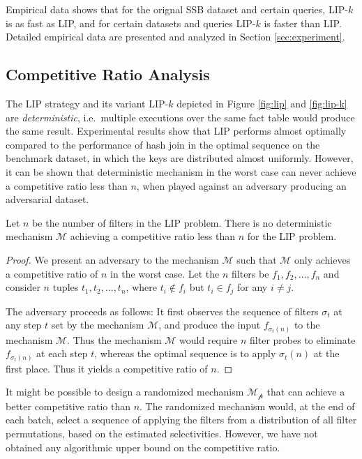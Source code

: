 Empirical data shows that for the orignal SSB dataset and certain queries, LIP-$k$ is as fast as LIP, and for certain datasets and queries LIP-$k$ is faster than LIP. Detailed empirical data are presented and analyzed in Section \ref{sec:experiment}.



\subsection{Competitive Ratio Analysis}

The LIP strategy and its variant LIP-$k$ depicted in Figure \ref{fig:lip} and \ref{fig:lip-k} are \textit{deterministic}, i.e.\ multiple executions over the same fact table would produce the same result. Experimental results show that LIP performs almost optimally compared to the performance of hash join in the optimal sequence \cite{zhu2017looking} on the benchmark dataset, in which the keys are distributed almost uniformly. However, it can be shown that deterministic mechanism in the worst case can never achieve a competitive ratio less than $n$, when played against an adversary producing an adversarial dataset.


\begin{theorem}\label{thm:det-n}
	Let $n$ be the number of filters in the LIP problem. There is no deterministic mechanism $\mathcal{M}$ achieving a competitive ratio less than $n$ for the \textsc{LIP} problem.

\end{theorem}

\begin{proof}
	We present an adversary to the mechanism $\mathcal{M}$ such that $\mathcal{M}$ only achieves a competitive ratio of $n$ in the worst case. Let the $n$ filters be $f_1, f_2, \dots, f_n$ and consider $n$ tuples $t_1, t_2, \dots, t_n$, where $t_i \notin f_i$ but $t_i \in f_j$ for any $i \neq j$.

	The adversary proceeds as follows: It first observes the sequence of filters $\sigma_t$ at any step $t$ set by the mechanism $\mathcal{M}$, and produce the input $f_{\sigma_t(n)}$ to the mechanism $\mathcal{M}$. Thus the mechanism $\mathcal{M}$ would require $n$ filter probes to eliminate $f_{\sigma_t(n)}$ at each step $t$, whereas the optimal sequence is to apply $\sigma_t(n)$ at the first place. Thus it yields a competitive ratio of $n$.
\end{proof}


It might be possible to design a randomized mechanism $\mathcal{M_p}$ that can achieve a better competitive ratio than $n$. The randomized mechanism would, at the end of each batch, select a sequence of applying the filters from a distribution of all filter permutations, based on the estimated selectivities. However, we have not obtained any algorithmic upper bound on the competitive ratio.  


